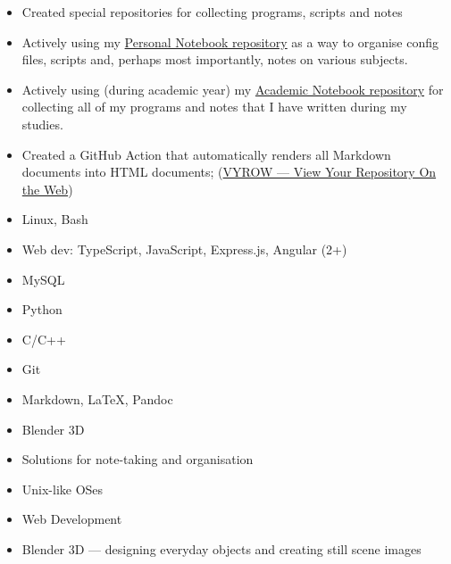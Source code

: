 \documentclass[10pt,a4paper,ragged2e,withhyper]{altacv}
\begin{document}
\begin{paracol}{2}
\begin{itemize}
\item Created special repositories for collecting programs, scripts and notes
\item Actively using my \href{https://personal.jerry-sky.me}{Personal Notebook repository} as a way to organise config files, scripts and, perhaps most importantly, notes on various subjects.
\item Actively using (during academic year) my \href{https://academic.jerry-sky.me}{Academic Notebook repository} for collecting all of my programs and notes that I have written during my studies.
\item Created a GitHub Action that automatically renders all Markdown documents into HTML documents; (\href{https://github.com/marketplace/actions/vyrow}{VYROW — View Your Repository On the Web})
\end{itemize}

\divider

\switchcolumn



\begin{itemize}
\item Linux, Bash
\item Web dev: TypeScript, JavaScript, Express.js, Angular (2+)
\item MySQL
\item Python
\item C/C++
\item Git
\item Markdown, LaTeX, Pandoc
\item Blender 3D
\end{itemize}


\begin{itemize}
  \item Solutions for note-taking and organisation
  \item Unix-like OSes
  \item Web Development
  \item Blender 3D — designing everyday objects and creating still scene images
\end{itemize}


\end{paracol}
\end{document}
